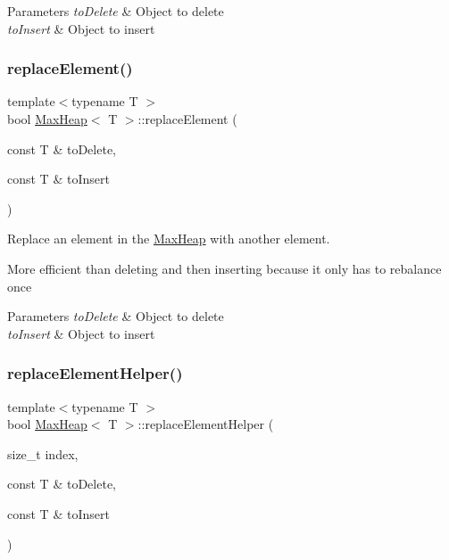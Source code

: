 \begin{DoxyParams}{Parameters}
{\em to\+Delete} & Object to delete \\
\hline
{\em to\+Insert} & Object to insert \\
\hline
\end{DoxyParams}
\mbox{\label{class_max_heap_a3ce799416b9373ec7a9f1fe2739812f1}} 
\subsubsection{\texorpdfstring{replace\+Element()}{replaceElement()}}
{\footnotesize\ttfamily template$<$typename T $>$ \\
bool \hyperlink{class_max_heap}{Max\+Heap}$<$ T $>$\+::replace\+Element (\begin{DoxyParamCaption}\item[{const T \&}]{to\+Delete,  }\item[{const T \&}]{to\+Insert }\end{DoxyParamCaption})}



Replace an element in the \hyperlink{class_max_heap}{Max\+Heap} with another element. 

More efficient than deleting and then inserting because it only has to rebalance once


\begin{DoxyParams}{Parameters}
{\em to\+Delete} & Object to delete \\
\hline
{\em to\+Insert} & Object to insert \\
\hline
\end{DoxyParams}
\mbox{\label{class_max_heap_a26e23759a8c4a77c01b3b7d4f0eca424}} 
\subsubsection{\texorpdfstring{replace\+Element\+Helper()}{replaceElementHelper()}}
{\footnotesize\ttfamily template$<$typename T $>$ \\
bool \hyperlink{class_max_heap}{Max\+Heap}$<$ T $>$\+::replace\+Element\+Helper (\begin{DoxyParamCaption}\item[{size\+\_\+t}]{index,  }\item[{const T \&}]{to\+Delete,  }\item[{const T \&}]{to\+Insert }\end{DoxyParamCaption})\hspace{0.3cm}{\ttfamily [private]}}



